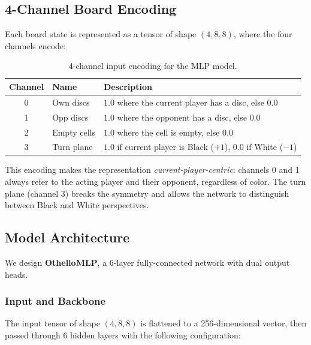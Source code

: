 \subsection{4-Channel Board Encoding}
\label{sec:encoding}

Each board state is represented as a tensor of shape $(4, 8, 8)$, where the four channels encode:

\begin{table}[H]
    \centering
    \caption{4-channel input encoding for the MLP model.}
    \label{tab:encoding}
    \begin{tabular}{clp{7cm}}
        \toprule
        \textbf{Channel} & \textbf{Name} & \textbf{Description} \\
        \midrule
        0 & Own discs   & $1.0$ where the current player has a disc, else $0.0$ \\
        1 & Opp discs   & $1.0$ where the opponent has a disc, else $0.0$ \\
        2 & Empty cells & $1.0$ where the cell is empty, else $0.0$ \\
        3 & Turn plane  & $1.0$ if current player is Black ($+1$), $0.0$ if White ($-1$) \\
        \bottomrule
    \end{tabular}
\end{table}

This encoding makes the representation \textit{current-player-centric}: channels 0 and 1 always refer to the acting player and their opponent, regardless of color. The turn plane (channel 3) breaks the symmetry and allows the network to distinguish between Black and White perspectives.

\subsection{Model Architecture}

We design \textbf{OthelloMLP}, a 6-layer fully-connected network with dual output heads.

\subsubsection{Input and Backbone}

The input tensor of shape $(4, 8, 8)$ is flattened to a 256-dimensional vector, then passed through 6 hidden layers with the following configuration:

